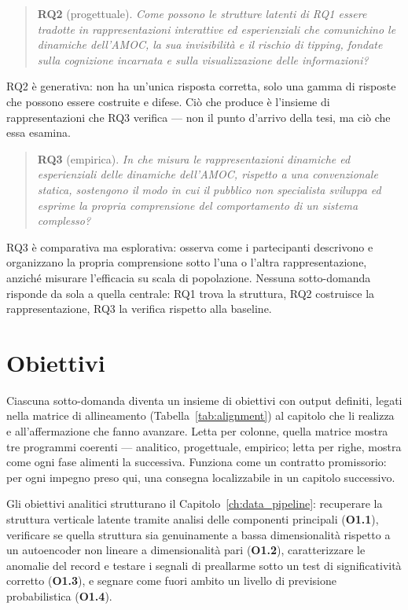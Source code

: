 \begin{quote}
\textbf{RQ2} (progettuale). \emph{Come possono le strutture latenti di RQ1 essere tradotte in rappresentazioni interattive ed esperienziali che comunichino le dinamiche dell'AMOC, la sua invisibilità e il rischio di tipping, fondate sulla cognizione incarnata e sulla visualizzazione delle informazioni?}
\end{quote}

RQ2 è generativa: non ha un'unica risposta corretta, solo una gamma di risposte che possono essere costruite e difese. Ciò che produce è l'insieme di rappresentazioni che RQ3 verifica --- non il punto d'arrivo della tesi, ma ciò che essa esamina.

\begin{quote}
\textbf{RQ3} (empirica). \emph{In che misura le rappresentazioni dinamiche ed esperienziali delle dinamiche dell'AMOC, rispetto a una convenzionale statica, sostengono il modo in cui il pubblico non specialista sviluppa ed esprime la propria comprensione del comportamento di un sistema complesso?}
\end{quote}

RQ3 è comparativa ma esplorativa: osserva come i partecipanti descrivono e organizzano la propria comprensione sotto l'una o l'altra rappresentazione, anziché misurare l'efficacia su scala di popolazione. Nessuna sotto-domanda risponde da sola a quella centrale: RQ1 trova la struttura, RQ2 costruisce la rappresentazione, RQ3 la verifica rispetto alla baseline.

\section{Obiettivi}
\label{sec:objectives}

Ciascuna sotto-domanda diventa un insieme di obiettivi con output definiti, legati nella matrice di allineamento (Tabella~\ref{tab:alignment}) al capitolo che li realizza e all'affermazione che fanno avanzare. Letta per colonne, quella matrice mostra tre programmi coerenti --- analitico, progettuale, empirico; letta per righe, mostra come ogni fase alimenti la successiva. Funziona come un contratto promissorio: per ogni impegno preso qui, una consegna localizzabile in un capitolo successivo.

Gli obiettivi analitici strutturano il Capitolo~\ref{ch:data_pipeline}: recuperare la struttura verticale latente tramite analisi delle componenti principali (\textbf{O1.1}), verificare se quella struttura sia genuinamente a bassa dimensionalità rispetto a un autoencoder non lineare a dimensionalità pari (\textbf{O1.2}), caratterizzare le anomalie del record e testare i segnali di preallarme sotto un test di significatività corretto (\textbf{O1.3}), e segnare come fuori ambito un livello di previsione probabilistica (\textbf{O1.4}).


